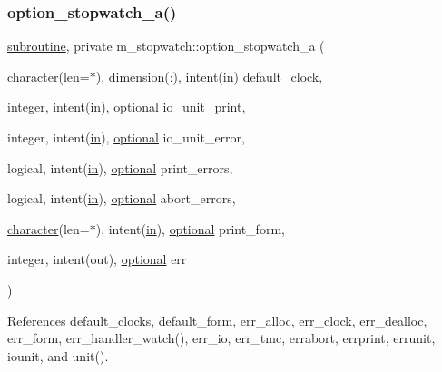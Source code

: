 \subsubsection{\texorpdfstring{option\+\_\+stopwatch\+\_\+a()}{option\_stopwatch\_a()}}
{\footnotesize\ttfamily \hyperlink{M__stopwatch_83_8txt_acfbcff50169d691ff02d4a123ed70482}{subroutine}, private m\+\_\+stopwatch\+::option\+\_\+stopwatch\+\_\+a (\begin{DoxyParamCaption}\item[{\hyperlink{option__stopwatch_83_8txt_abd4b21fbbd175834027b5224bfe97e66}{character}(len=$\ast$), dimension(\+:), intent(\hyperlink{M__journal_83_8txt_afce72651d1eed785a2132bee863b2f38}{in})}]{default\+\_\+clock,  }\item[{integer, intent(\hyperlink{M__journal_83_8txt_afce72651d1eed785a2132bee863b2f38}{in}), \hyperlink{option__stopwatch_83_8txt_aa4ece75e7acf58a4843f70fe18c3ade5}{optional}}]{io\+\_\+unit\+\_\+print,  }\item[{integer, intent(\hyperlink{M__journal_83_8txt_afce72651d1eed785a2132bee863b2f38}{in}), \hyperlink{option__stopwatch_83_8txt_aa4ece75e7acf58a4843f70fe18c3ade5}{optional}}]{io\+\_\+unit\+\_\+error,  }\item[{logical, intent(\hyperlink{M__journal_83_8txt_afce72651d1eed785a2132bee863b2f38}{in}), \hyperlink{option__stopwatch_83_8txt_aa4ece75e7acf58a4843f70fe18c3ade5}{optional}}]{print\+\_\+errors,  }\item[{logical, intent(\hyperlink{M__journal_83_8txt_afce72651d1eed785a2132bee863b2f38}{in}), \hyperlink{option__stopwatch_83_8txt_aa4ece75e7acf58a4843f70fe18c3ade5}{optional}}]{abort\+\_\+errors,  }\item[{\hyperlink{option__stopwatch_83_8txt_abd4b21fbbd175834027b5224bfe97e66}{character}(len=$\ast$), intent(\hyperlink{M__journal_83_8txt_afce72651d1eed785a2132bee863b2f38}{in}), \hyperlink{option__stopwatch_83_8txt_aa4ece75e7acf58a4843f70fe18c3ade5}{optional}}]{print\+\_\+form,  }\item[{integer, intent(out), \hyperlink{option__stopwatch_83_8txt_aa4ece75e7acf58a4843f70fe18c3ade5}{optional}}]{err }\end{DoxyParamCaption})\hspace{0.3cm}{\ttfamily [private]}}



References default\+\_\+clocks, default\+\_\+form, err\+\_\+alloc, err\+\_\+clock, err\+\_\+dealloc, err\+\_\+form, err\+\_\+handler\+\_\+watch(), err\+\_\+io, err\+\_\+tmc, errabort, errprint, errunit, iounit, and unit().


